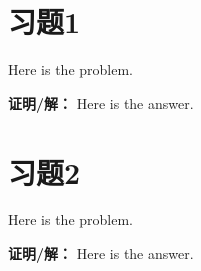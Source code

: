 \documentclass[12pt,a4paper]{article}
\begin{document}
\maketitle

\section{习题1}
Here is the problem.

\vspace{0.5cm}

\noindent\textbf{证明/解：} Here is the answer.

\section{习题2}
Here is the problem.

\vspace{0.5cm}

\noindent\textbf{证明/解：} Here is the answer.

\end{document}
